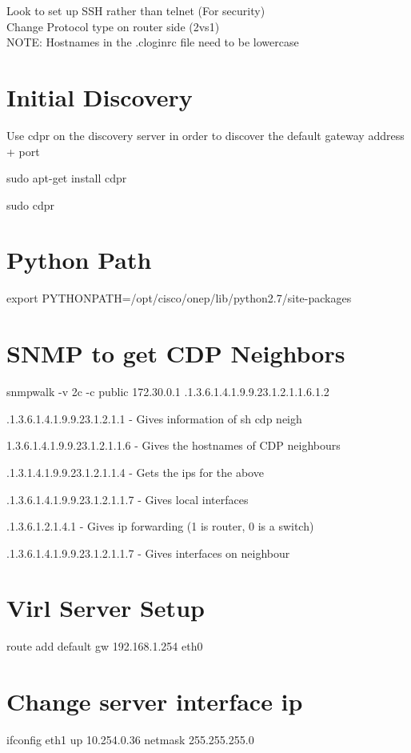\documentclass[11pt]{report}
\begin{document}
Look to set up SSH rather than telnet (For security)
\\
Change Protocol type on router side (2vs1)
\\
NOTE: Hostnames in the .cloginrc file need to be lowercase

\section*{Initial Discovery}

Use cdpr on the discovery server in order to discover the default gateway address + port

sudo apt-get install cdpr

sudo cdpr

\section*{Python Path}

 export PYTHONPATH=/opt/cisco/onep/lib/python2.7/site-packages
 
\section*{SNMP to get CDP Neighbors}

snmpwalk -v 2c -c public 172.30.0.1 .1.3.6.1.4.1.9.9.23.1.2.1.1.6.1.2

.1.3.6.1.4.1.9.9.23.1.2.1.1 - Gives information of sh cdp neigh

1.3.6.1.4.1.9.9.23.1.2.1.1.6  - Gives the hostnames of CDP neighbours 

.1.3.1.4.1.9.9.23.1.2.1.1.4 - Gets the ips for the above

.1.3.6.1.4.1.9.9.23.1.2.1.1.7 - Gives local interfaces

.1.3.6.1.2.1.4.1 - Gives ip forwarding (1 is router, 0 is a switch)

.1.3.6.1.4.1.9.9.23.1.2.1.1.7 - Gives interfaces on neighbour

\section{Virl Server Setup}
route add default gw 192.168.1.254 eth0

\section{Change server interface ip}
ifconfig eth1 up 10.254.0.36 netmask 255.255.255.0
\end{document}
